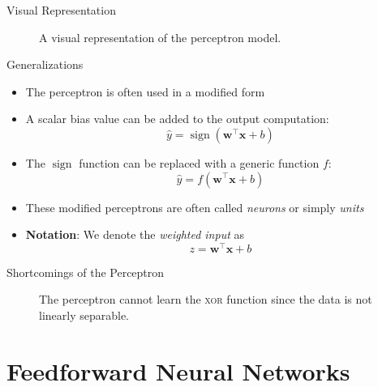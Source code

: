 \documentclass{beamer}
\DeclareMathOperator{\sign}{sign}
\begin{document}
	\begin{frame}{Visual Representation}
		\begin{figure}
			
			\caption{A visual representation of the perceptron model.}
		\end{figure}
	\end{frame}
	\begin{frame}{Generalizations}
		\begin{itemize}
			\item <1-> The perceptron is often used in a modified form
			\item <2-> A scalar bias value can be added to the output computation:
			\begin{equation}
			\hat{y} = \sign\left (\bm{w}^\top\bm{x} + b\right )
			\end{equation}
			\item <3-> The $\sign$ function can be replaced with a generic function $f$:
			\begin{equation}
			\hat{y} = f\left (\bm{w}^\top\bm{x} + b\right )
			\end{equation}
			\item <4-> These modified perceptrons are often called \emph{neurons} or simply \emph{units}
			\item <5-> \textbf{Notation}: We denote the \emph{weighted input} as
			\begin{equation}
			z = \bm{w}^\top\bm{x} + b
			\end{equation}
		\end{itemize}
	\end{frame}
	\begin{frame}{Shortcomings of the Perceptron}
		\begin{figure}
						
			\caption{The perceptron cannot learn the \textsc{xor} function since the data is not linearly separable.}
		\end{figure}
	\end{frame}
	
	\section{Feedforward Neural Networks}
	
\end{document}
